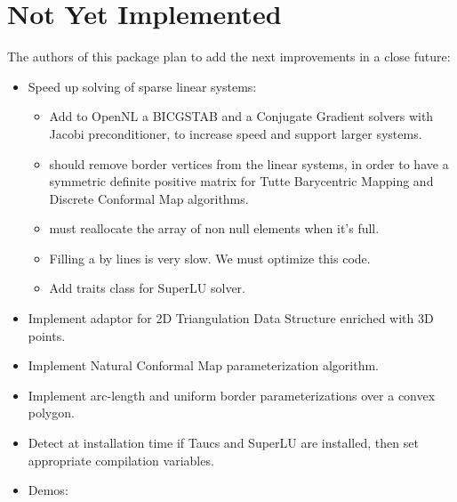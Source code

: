 \section{Not Yet Implemented}

The authors of this package plan to add the next improvements in a close
future:

\begin{itemize}

\item Speed up solving of sparse linear systems:

    \begin{itemize}

    \item Add to OpenNL a BICGSTAB and a Conjugate Gradient solvers
    with Jacobi preconditioner, to increase speed and support larger systems.

    \item {} should remove border vertices from
    the linear systems, in order to have a symmetric definite positive matrix
    for Tutte Barycentric Mapping and Discrete Conformal Map algorithms.

    \item {} must reallocate the array of non null elements when it's full.

    \item Filling a  by lines is very slow. We must optimize this code.

    \item Add traits class for SuperLU solver.

    \end{itemize}

\item Implement  adaptor for 2D Triangulation
Data Structure enriched with 3D points.

\item Implement Natural Conformal Map parameterization algorithm.

\item Implement arc-length and uniform border parameterizations
      over a convex polygon.

\item Detect at installation time if {\sc Taucs} and SuperLU are installed,
      then set appropriate compilation variables.

\item Demos:


\end{itemize}
